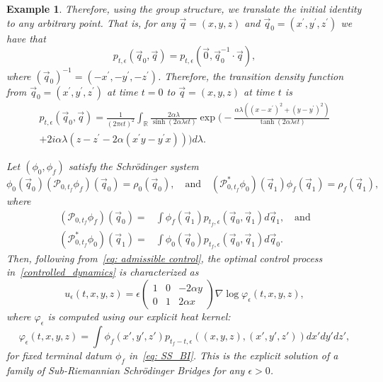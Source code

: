 \documentclass{amsart}
\newtheorem{example}[theorem]{Example}
\numberwithin{equation}{section}
\begin{document}
\begin{example}
{ Therefore, using the group structure, we translate the initial identity to any arbitrary point. That is, for any $\vec{q}=(x,y,z)$ and $\vec{q}_0=(x^\prime,y^\prime,z^\prime)$ we have that 
 \[
p_{t,\epsilon}(\vec{q}_0, \vec{q})=p_{t,\epsilon}(\vec{0}, \vec{q}_0^{-1}\cdot\vec{q}), 
\]
where $(\vec{q}_0)^{-1} =(-x^\prime, -y^\prime, -z^\prime)$. Therefore, the transition density function from $\vec{q}_0=(x^\prime,y^\prime,z^\prime)$ at time $t=0$ to $\vec{q}=(x,y,z)$ at time $t$ is
\begin{multline}\label{eq: unified_heat_kernel}
p_{t,\epsilon}(\vec{q}_0, \vec{q}) = \frac{1}{(2\pi\epsilon t)^2} \int_{\mathbb{R}} \frac{2\alpha\lambda}{\sinh(2\alpha\lambda \epsilon t)} 
\exp\bigg(-\frac{\alpha\lambda((x-x^\prime)^2 + (y-y^\prime)^2)}{\tanh(2\alpha\lambda \epsilon t)} \\
+ 2i\alpha\lambda (z - z^\prime - 2\alpha(x^\prime y - y^\prime x))\bigg) d\lambda.
\end{multline}

Let $(\phi_0,\phi_f)$ satisfy the  Schr\"odinger system 
\begin{equation}\label{eq: SS_BI}
\phi_0(\vec{q}_0)(\mathscr P_{0,t_f} \phi_f)(\vec{q}_0)= \rho_0(\vec{q}_0), \quad\text{and}\quad
(\mathscr P_{0,t_f}^* \phi_0)(\vec{q}_1)\phi_f(\vec{q}_1)= \rho_f(\vec{q}_1),    
\end{equation}
where
\begin{align*}
(\mathscr P_{0,t_f} \phi_f)(\vec{q}_0) =& \int \phi_f(\vec{q}_1) p_{t_f,\epsilon}(\vec{q}_0, \vec{q}_1) d\vec{q}_1, \quad \text{and}\\ 
(\mathscr P_{0,t_f}^* \phi_0)(\vec{q}_1)=& \int \phi_0(\vec{q}_0) p_{t_f,\epsilon}(\vec{q}_0, \vec{q}_1) d\vec{q}_0.    
\end{align*}
Then, following from~\eqref{eq: admissible control}, the optimal control process in~\eqref{controlled_dynamics} is characterized as 
\begin{equation}\label{eq: unified_optimal_control}
 u_{\epsilon}(t,x,y,z) = \epsilon \begin{pmatrix}
1 & 0 & -2\alpha y \\
0 & 1 & 2\alpha x
\end{pmatrix} \nabla\log\varphi_\epsilon(t,x,y,z),   
\end{equation}
where $\varphi_\epsilon$ is computed using our explicit heat kernel:
\begin{equation}\label{eq: unified_phi_definition}
\varphi_\epsilon(t,x,y,z) = \int \phi_f(x',y',z') p_{t_f-t,\epsilon}((x,y,z), (x',y',z')) dx'dy'dz',
\end{equation}
for fixed terminal datum $\phi_f$ in~\eqref{eq: SS_BI}. This is the explicit solution of a family of Sub-Riemannian Schr\"odinger Bridges for any $\epsilon>0$.

}
\end{example}
\end{document}
